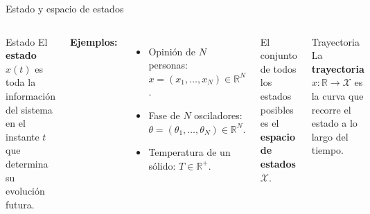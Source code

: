 \documentclass[aspectratio=169,10pt]{beamer}
\newcommand{\R}{\mathbb{R}}
\begin{document}
\begin{frame}{Estado y espacio de estados}
\begin{columns}[T]
\begin{defbox}{Estado}
El \textbf{estado} $x(t)$ es toda la informaci\'on del sistema en el instante $t$
que determina su evoluci\'on futura.
\end{defbox}

\vspace{8pt}
\textbf{Ejemplos:}
\begin{itemize}\small
  \item Opini\'on de $N$ personas:\quad
        $x = (x_1,\ldots,x_N)\in\R^N$.
  \item Fase de $N$ osciladores:\quad
        $\theta = (\theta_1,\ldots,\theta_N)\in\R^N$.
  \item Temperatura de un s\'olido:\quad
        $T \in \R^+$.
\end{itemize}

\vspace{6pt}
El conjunto de todos los estados posibles es el
\textbf{espacio de estados} $\mathcal{X}$.

\begin{defbox}{Trayectoria}
La \textbf{trayectoria} $x:\R\to\mathcal{X}$ es la curva
que recorre el estado a lo largo del tiempo.
\end{defbox}

\vspace{6pt}
\begin{center}
\end{center}
\end{columns}
\end{frame}
\end{document}
